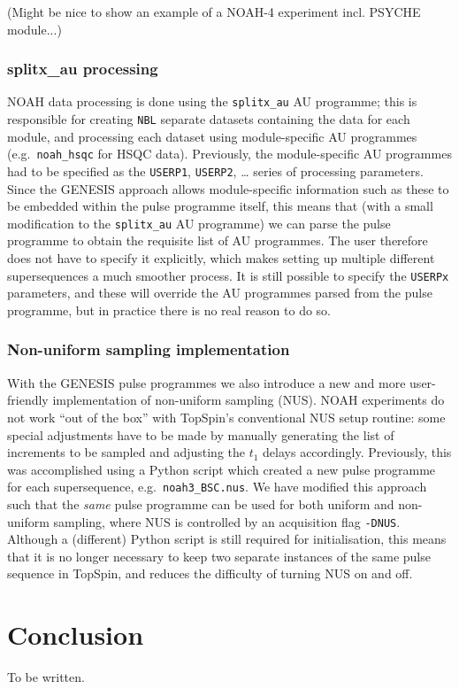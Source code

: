 \documentclass[a4paper,11pt]{article}
\newcommand{\carbon}{\ce{^{13}C}}
\newcommand{\todo}[1]{\textcolor{WildStrawberry}{#1}}
\begin{document}
\todo{(Might be nice to show an example of a NOAH-4 experiment incl. PSYCHE module...)}

\subsubsection{splitx\_au processing}

NOAH data processing is done using the \texttt{splitx\_au} AU programme; this is responsible for creating \texttt{NBL} separate datasets containing the data for each module, and processing each dataset using module-specific AU programmes (e.g.\ \texttt{noah\_hsqc} for \carbon{} HSQC data).
Previously, the module-specific AU programmes had to be specified as the \texttt{USERP1}, \texttt{USERP2}, \ldots{} series of processing parameters.
Since the GENESIS approach allows module-specific information such as these to be embedded within the pulse programme itself, this means that (with a small modification to the \texttt{splitx\_au} AU programme) we can parse the pulse programme to obtain the requisite list of AU programmes.
The user therefore does not have to specify it explicitly, which makes setting up multiple different supersequences a much smoother process.
It is still possible to specify the \texttt{USERPx} parameters, and these will override the AU programmes parsed from the pulse programme, but in practice there is no real reason to do so.

\subsubsection{Non-uniform sampling implementation}

With the GENESIS pulse programmes we also introduce a new and more user-friendly implementation of non-uniform sampling (NUS).
NOAH experiments do not work ``out of the box'' with TopSpin's conventional NUS setup routine: some special adjustments have to be made by manually generating the list of increments to be sampled and adjusting the $t_1$ delays accordingly.
Previously, this was accomplished using a Python script which created a new pulse programme for each supersequence, e.g.\ \texttt{noah3\_BSC.nus}.\autocite{Claridge2019MRC}
We have modified this approach such that the \textit{same} pulse programme can be used for both uniform and non-uniform sampling, where NUS is controlled by an acquisition flag \texttt{-DNUS}.
Although a (different) Python script is still required for initialisation, this means that it is no longer necessary to keep two separate instances of the same pulse sequence in TopSpin, and reduces the difficulty of turning NUS on and off.


\section{Conclusion}

\todo{To be written.}


\printbibliography{}
\end{document}
